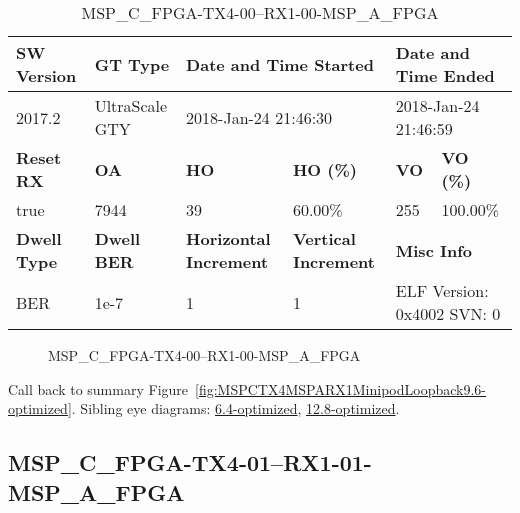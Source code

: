\begin{table}[h]
\centering
\caption{MSP\_C\_FPGA-TX4-00--RX1-00-MSP\_A\_FPGA}
\label{tab:MSPCFPGATX400RX100MSPAFPGA9.6-optimized}
\begin{tabular}{@{}|l|l|l|l|l|l|@{}}
\toprule
\textbf{SW Version}                & \textbf{GT Type}   & \multicolumn{2}{l|}{\textbf{Date and Time Started}}            & \multicolumn{2}{l|}{\textbf{Date and Time Ended}}        \\ \midrule
2017.2                       & UltraScale GTY          & \multicolumn{2}{l|}{2018-Jan-24 21:46:30}                   & \multicolumn{2}{l|}{2018-Jan-24 21:46:59}               \\ \midrule
\textbf{Reset RX}                  & \textbf{OA} & \textbf{HO}   & \textbf{HO (\%)} & \textbf{VO} & \textbf{VO (\%)} \\ \midrule
true & 7944        & 39          & 60.00\%        & 255        & 100.00\%       \\ \midrule
\textbf{Dwell Type}                & \textbf{Dwell BER} & \textbf{Horizontal Increment} & \textbf{Vertical Increment}    & \multicolumn{2}{l|}{\textbf{Misc Info}}                  \\ \midrule
BER                            & 1e-7        & 1        & 1           & \multicolumn{2}{l|}{ELF Version: 0x4002 SVN: 0}                         \\ \bottomrule
\end{tabular}
\end{table}

\begin{figure}[h]
\caption{MSP\_C\_FPGA-TX4-00--RX1-00-MSP\_A\_FPGA} \label{fig:MSPCFPGATX400RX100MSPAFPGA9.6-optimized}
\end{figure}

Call back to summary Figure~\ref{fig:MSPCTX4MSPARX1MinipodLoopback9.6-optimized}.
Sibling eye diagrams: \hyperref[sec:MSPCFPGATX400RX100MSPAFPGA6.4-optimized]{6.4-optimized}, \hyperref[sec:MSPCFPGATX400RX100MSPAFPGA12.8-optimized]{12.8-optimized}.

\clearpage
\newpage


\subsection{MSP\_C\_FPGA-TX4-01--RX1-01-MSP\_A\_FPGA}\label{sec:MSPCFPGATX401RX101MSPAFPGA9.6-optimized}

